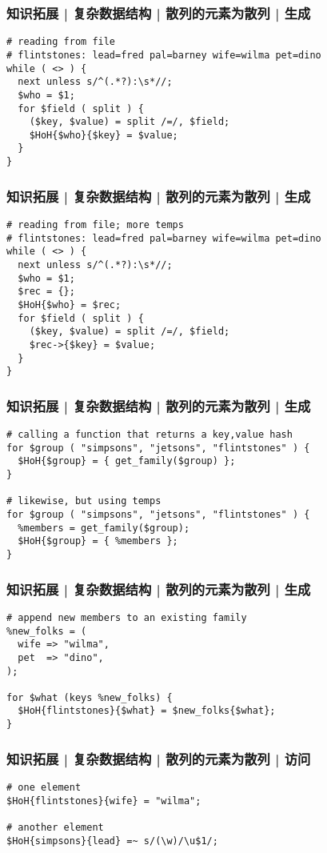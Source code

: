 \begin{frame}[fragile]
  \frametitle{知识拓展 | 复杂数据结构 | 散列的元素为散列 | 生成}
\begin{lstlisting}
# reading from file
# flintstones: lead=fred pal=barney wife=wilma pet=dino
while ( <> ) {
  next unless s/^(.*?):\s*//;
  $who = $1;
  for $field ( split ) {
    ($key, $value) = split /=/, $field;
    $HoH{$who}{$key} = $value;
  }
}
\end{lstlisting}
\end{frame}

\begin{frame}[fragile]
  \frametitle{知识拓展 | 复杂数据结构 | 散列的元素为散列 | 生成}
\begin{lstlisting}
# reading from file; more temps
# flintstones: lead=fred pal=barney wife=wilma pet=dino
while ( <> ) {
  next unless s/^(.*?):\s*//;
  $who = $1;
  $rec = {};
  $HoH{$who} = $rec;
  for $field ( split ) {
    ($key, $value) = split /=/, $field;
    $rec->{$key} = $value;
  }
}
\end{lstlisting}
\end{frame}

\begin{frame}[fragile]
  \frametitle{知识拓展 | 复杂数据结构 | 散列的元素为散列 | 生成}
\begin{lstlisting}
# calling a function that returns a key,value hash
for $group ( "simpsons", "jetsons", "flintstones" ) {
  $HoH{$group} = { get_family($group) };
}

# likewise, but using temps
for $group ( "simpsons", "jetsons", "flintstones" ) {
  %members = get_family($group);
  $HoH{$group} = { %members };
}
\end{lstlisting}
\end{frame}

\begin{frame}[fragile]
  \frametitle{知识拓展 | 复杂数据结构 | 散列的元素为散列 | 生成}
\begin{lstlisting}
# append new members to an existing family
%new_folks = (
  wife => "wilma",
  pet  => "dino",
);

for $what (keys %new_folks) {
  $HoH{flintstones}{$what} = $new_folks{$what};
}
\end{lstlisting}
\end{frame}

\begin{frame}[fragile]
  \frametitle{知识拓展 | 复杂数据结构 | 散列的元素为散列 | 访问}
\begin{lstlisting}
# one element
$HoH{flintstones}{wife} = "wilma";

# another element
$HoH{simpsons}{lead} =~ s/(\w)/\u$1/;
\end{lstlisting}
\end{frame}


